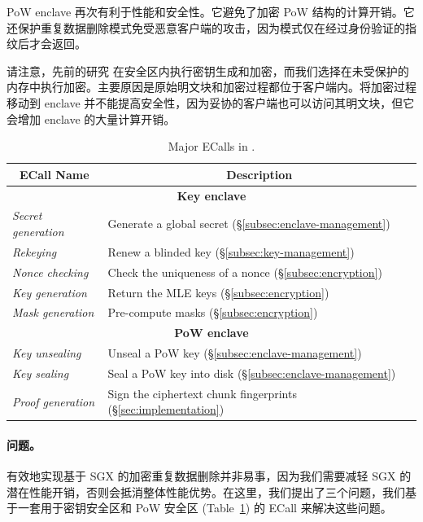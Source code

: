 PoW enclave 再次有利于性能和安全性。它避免了加密 PoW 结构的计算开销。它还保护重复数据删除模式免受恶意客户端的攻击，因为模式仅在经过身份验证的指纹后才会返回。

请注意，先前的研究 \cite{kim19,fuhry20,djoko19} 在安全区内执行密钥生成和加密，而我们选择在未受保护的内存中执行加密。主要原因是原始明文块和加密过程都位于客户端内。将加密过程移动到 enclave 并不能提高安全性，因为妥协的客户端也可以访问其明文块，但它会增加 enclave 的大量计算开销。

\begin{table}[t]
\small
\centering
\begin{tabular}{|l|l|}
\hline
\multicolumn{1}{|c|}{\bf ECall Name} & \multicolumn{1}{c|}{\bf Description}\\ 
\hline
\hline
\multicolumn{2}{|c|}{\bf Key enclave} \\
\hline
\textit{ Secret generation} & Generate a global secret 
(\S\ref{subsec:enclave-management}) \\
\hline
\textit{ Rekeying} & Renew a blinded key 
(\S\ref{subsec:key-management}) \\
\hline
\textit{ Nonce checking} & Check the uniqueness of a nonce 
(\S\ref{subsec:encryption}) \\
\hline
\textit{ Key generation} & Return the MLE keys (\S\ref{subsec:encryption}) \\
\hline
\textit{ Mask generation} & Pre-compute masks (\S\ref{subsec:encryption}) \\
\hline
\multicolumn{2}{|c|}{\bf PoW enclave} \\
\hline
  \textit{ Key unsealing} & Unseal a PoW key (\S\ref{subsec:enclave-management}) \\
\hline
  \textit{ Key sealing} & Seal a PoW key into disk (\S\ref{subsec:enclave-management})
\\
\hline
\textit{ Proof generation} & Sign the ciphertext chunk fingerprints 
(\S\ref{sec:implementation}) \\
\hline
\end{tabular}
\vspace{-6pt}
\caption{Major ECalls in \sysname.}
\label{tab:ecall}
\vspace{-3pt}
\end{table}


\paragraph{问题。} 有效地​​实现基于 SGX 的加密重复数据删除并非易事，因为我们需要减轻 SGX 的潜在性能开销，否则会抵消整体性能优势。在这里，我们提出了三个问题，我们基于一套用于密钥安全区和 PoW 安全区 (Table~\ref{tab:ecall}) 的 ECall 来解决这些问题。

